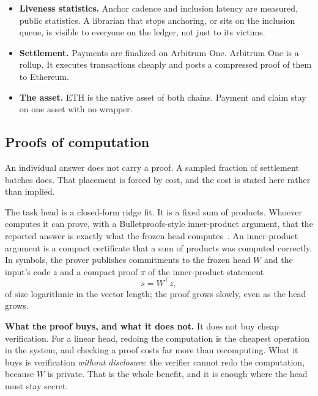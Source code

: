 \documentclass[11pt]{article}
\begin{document}
\begin{itemize}
          The force-inclusion queue reads the librarian's address from the
          ledger rather than storing its own copy, so a replacement reaches
          the contract that contains a misbehaving librarian at the moment it
          reaches anything else. The deputy inherits the open queue. An entry
          someone is being censored over survives the replacement it may well
          have caused.
    \item \textbf{Liveness statistics.} Anchor cadence and
          inclusion latency are measured, public statistics. A librarian
          that stops anchoring, or sits on the inclusion queue, is visible
          to everyone on the ledger, not just to its victims.
    \item \textbf{Settlement.} Payments are finalized on Arbitrum One.
          Arbitrum One is a rollup. It executes transactions cheaply and
          posts a compressed proof of them to Ethereum.
    \item \textbf{The asset.} ETH is the native asset of both chains.
          Payment and claim stay on one asset with no wrapper.
\end{itemize}

\subsection{Proofs of computation}\label{sec:proofs}

An individual answer does not carry a proof. A sampled fraction of
settlement batches does. That placement is forced by cost, and the
cost is stated here rather than implied.

The task head is a closed-form ridge fit. It is a fixed sum of
products. Whoever computes it can prove, with a Bulletproofs-style
inner-product argument, that the reported answer is exactly what
the frozen head computes~\cite{bunz2018}. An inner-product
argument is a compact certificate that a sum of products was
computed correctly. In symbols, the prover
publishes commitments to the frozen head $W$ and the input's
code $z$ and a compact proof $\pi$ of the inner-product
statement
\begin{equation}
    s = W^\top z,
\end{equation}
of size logarithmic in the vector length; the proof grows
slowly, even as the head grows.

\textbf{What the proof buys, and what it does not.} It does not
buy cheap verification. For a linear head, redoing the computation
is the cheapest operation in the system, and checking a proof
costs far more than recomputing. What it buys is verification
\emph{without disclosure}: the verifier cannot redo the
computation, because $W$ is private. That is the whole benefit,
and it is enough where the head must stay secret.
\end{document}

